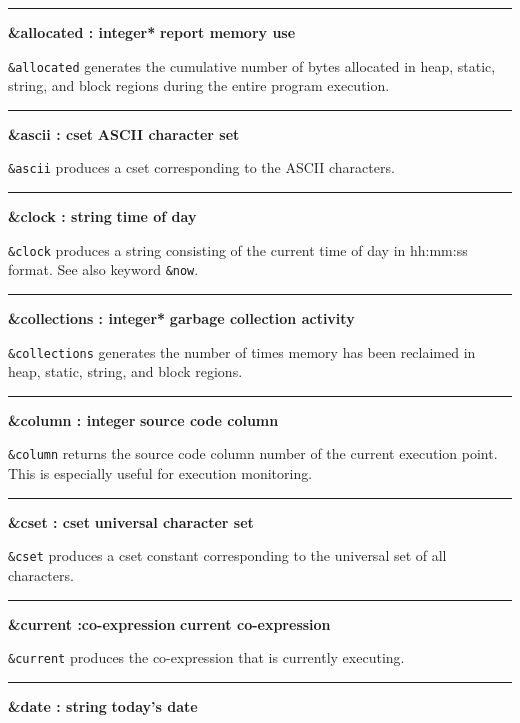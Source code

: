 \bigskip\hrule\vspace{0.1cm}
\noindent
{\bf \&allocated : integer* } \hfill {\bf report memory use}

\noindent
{}\texttt{\&allocated} generates the cumulative number
of bytes allocated in heap, static, string, and block regions during
the entire program execution.

\bigskip\hrule\vspace{0.1cm}
\noindent
{\bf \&ascii : cset } \hfill {\bf ASCII character set}

\noindent
{}\texttt{\&ascii} produces a cset corresponding to
the ASCII characters.

\bigskip\hrule\vspace{0.1cm}
\noindent
{\bf \&clock : string } \hfill {\bf time of day}

\noindent
\texttt{\&clock} produces a string consisting of the current
time of day in hh:mm:ss format.
See also keyword \texttt{\&now}.

\bigskip\hrule\vspace{0.1cm}
\noindent
{\bf \&collections : integer* } \hfill {\bf garbage collection activity}

\noindent
{}\texttt{\&collections} generates the number of
times memory has been reclaimed in heap, static, string, and block
regions.

\bigskip\hrule\vspace{0.1cm}
\noindent
{\bf \&column : integer } \hfill {\bf source code column}

\noindent
\texttt{\&column} returns the source code
column number of the current execution point. This
is especially useful for execution monitoring.

\bigskip\hrule\vspace{0.1cm}
\noindent
{\bf \&cset : cset } \hfill {\bf universal character set}

\noindent
{}\texttt{\&cset} produces a cset constant
corresponding to the universal set of all characters.

\bigskip\hrule\vspace{0.1cm}
\noindent
{\bf \&current :co{}-expression } \hfill {\bf current co{}-expression}

\noindent
{}\texttt{\&current} produces the
co-expression that is currently executing.

\bigskip\hrule\vspace{0.1cm}
\noindent
{\bf \&date : string } \hfill {\bf today's date}

